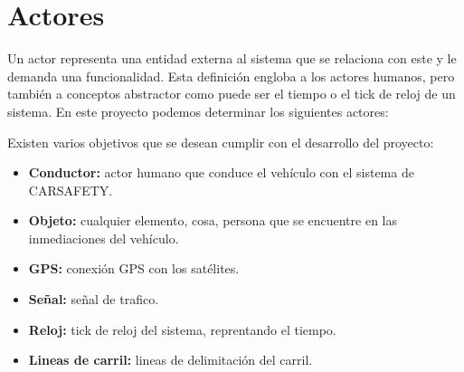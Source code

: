 \section{Actores}\label{sec:actors}

\par Un actor representa una entidad externa al sistema que se relaciona con este y le demanda una funcionalidad. Esta definición engloba a los actores humanos, pero también a conceptos abstractor como puede ser el tiempo o el tick de reloj de un sistema. En este proyecto podemos determinar los siguientes actores:
\par Existen varios objetivos que se desean cumplir con el desarrollo del proyecto:

\begin{itemize}[-]
\item \textbf{Conductor:} actor humano que conduce el vehículo con el sistema de CARSAFETY.
\item \textbf{Objeto:} cualquier elemento, cosa, persona que se encuentre en las inmediaciones del vehículo.
\item \textbf{GPS:} conexión GPS con los satélites.
\item \textbf{Señal:} señal de trafico.
\item \textbf{Reloj:} tick de reloj del sistema, reprentando el tiempo.
\item \textbf{Lineas de carril:} lineas de delimitación del carril.
\end{itemize}
